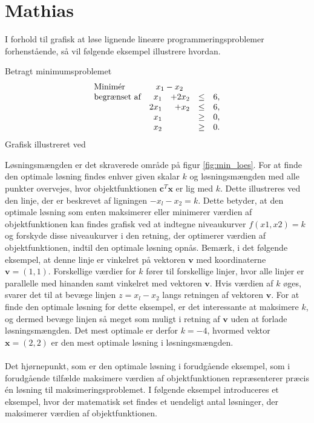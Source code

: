\section{Mathias}

I forhold til grafisk at løse lignende lineære programmeringsproblemer forhenstående, så vil følgende eksempel illustrere hvordan. 

\begin{eks}
\label{eks:min_loes}
Betragt minimumsproblemet
%
\begin{align*}
\begin{array}{lrrlr}
\text{Minimér}		&	\multicolumn{2}{c}{x_1-x_2}  &\\
\text{begrænset af}	&x_1& + 2x_2			&\leq 	& 6,\\
					&2x_1& + x_2			&\leq	& 6,\\
					&x_1&    				&\geq	& 0,\\
					&x_2&    				&\geq	& 0.\\
\end{array}
\end{align*}
%
Grafisk illustreret ved 
%

%
\end{eks}
\noindent
Løsningsmængden er det skraverede område på figur \ref{fig:min_loes}. For at finde den optimale løsning findes enhver given skalar $k$ og løsningsmængden med alle punkter overvejes, hvor objektfunktionen $\textbf{c}^T\textbf{x}$ er lig med $k$. Dette illustreres ved den linje, der er beskrevet af ligningen $-x_l-x_2=k$. Dette betyder, at den optimale løsning som enten maksimerer eller minimerer værdien
af objektfunktionen kan findes grafisk ved at indtegne niveaukurver $f(x1, x2)=k$ og forskyde disse niveaukurver i den retning, der optimerer værdien af objektfunktionen, indtil den optimale løsning opnås.  Bemærk, i det følgende eksempel, at denne linje er vinkelret på vektoren $\textbf{v}$ med koordinaterne $\textbf{v}=(1,1)$.
Forskellige værdier for $k$ fører til forskellige linjer, hvor  alle linjer er parallelle med hinanden samt vinkelret med vektoren $\textbf{v}$. Hvis værdien af $k$ øges, svarer det til at bevæge linjen $z=x_l-x_2$ langs retningen af vektoren $\textbf{v}$. For at finde den optimale løsning for dette eksempel, er det interessante at maksimere $k$, og dermed bevæge linjen så meget som muligt i retning af $\textbf{v}$ uden at forlade løsningsmængden. Det mest optimale er derfor $k = -4$, hvormed vektor $\textbf{x}=(2,2)$ er den mest optimale løsning i løsningsmængden. \\\\
Det hjørnepunkt, som er den optimale løsning i forudgående eksempel, som i forudgående tilfælde maksimere værdien
af objektfunktionen repræsenterer præcis én
løsning til maksimeringsproblemet. I følgende eksempel introduceres et eksempel, hvor der matematisk set findes et uendeligt antal løsninger, der
maksimerer værdien af objektfunktionen.
